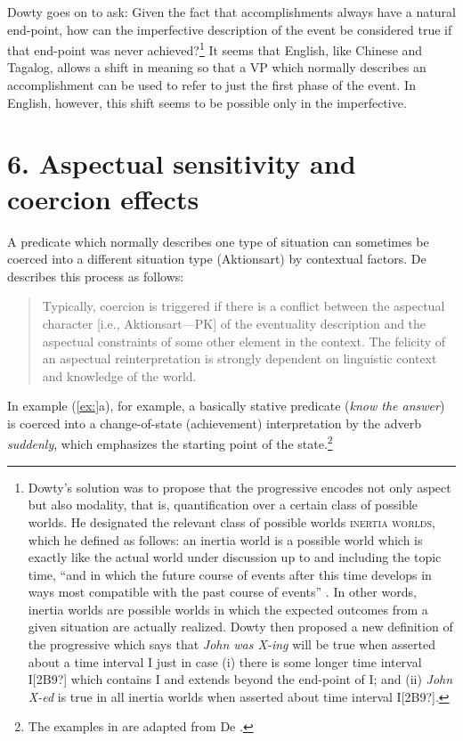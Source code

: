 Dowty goes on to ask: Given the fact that accomplishments always have a natural end-point, how can the imperfective description of the event be considered true if that end-point was never achieved?\footnote{Dowty’s solution was to propose that the progressive encodes not only aspect but also modality, that is, quantification over a certain class of possible worlds. He designated the relevant class of possible worlds \textsc{inertia worlds}, which he defined as follows: an inertia world is a possible world which is exactly like the actual world under discussion up to and including the topic time, “and in which the future course of events after this time develops in ways most compatible with the past course of events” \citep[148]{Dowty1979}. In other words, inertia worlds are possible worlds in which the expected outcomes from a given situation are actually realized. Dowty then proposed a new definition of the progressive which says that \textit{John was X-ing} will be true when asserted about a time interval I just in case (i) there is some longer time interval I[2B9?] which contains I and extends beyond the end-point of I; and (ii) \textit{John X-ed} is true in all inertia worlds when asserted about time interval I[2B9?].} It seems that English, like Chinese and Tagalog, allows a shift in meaning so that a VP which normally describes an accomplishment can be used to refer to just the first phase of the event. In English, however, this shift seems to be possible only in the imperfective.


\section{6. Aspectual sensitivity and coercion effects}\label{sec:}

A predicate which normally describes one type of situation can sometimes be coerced into a different situation type (Aktionsart) by contextual factors. De \citet[360]{Swart1998} describes this process as follows:


\begin{quote}
Typically, coercion is triggered if there is a conflict between the aspectual character [i.e., Aktionsart—PK] of the eventuality description and the aspectual constraints of some other element in the context. The felicity of an aspectual reinterpretation is strongly dependent on linguistic context and knowledge of the world.
\end{quote}


In example (\ref{ex:}a), for example, a basically stative predicate (\textit{know the answer}) is coerced into a change-of-state (achievement) interpretation by the adverb \textit{suddenly}, which emphasizes the starting point of the state.\footnote{The examples in  are adapted from De \citet[359]{Swart1998}.}


